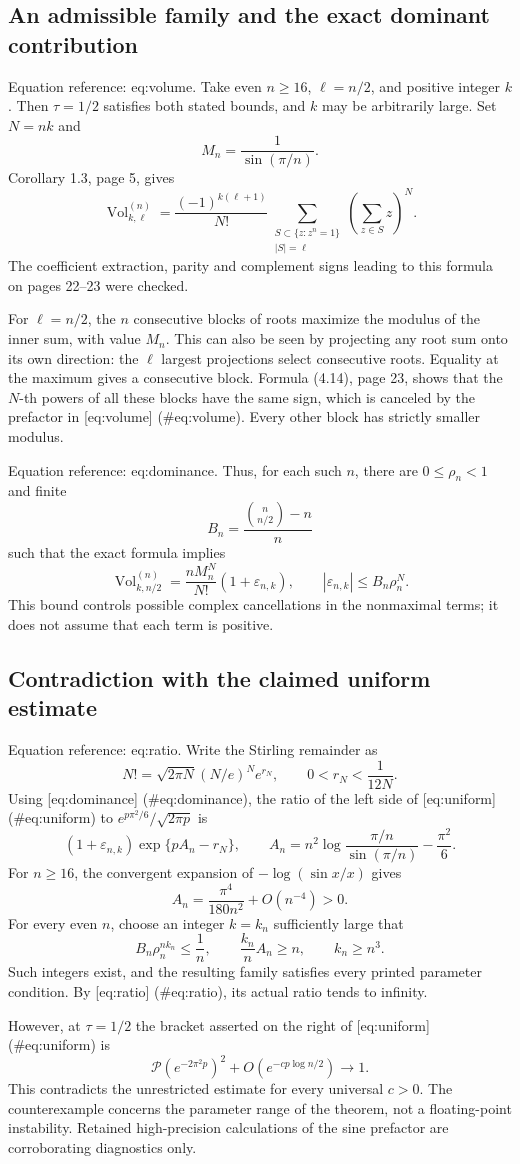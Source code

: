\documentclass[10pt]{article}
\begin{document}
\subsection*{An admissible family and the exact dominant contribution}
Equation reference: eq:volume. Take even \(n\geq16\), \(\ell=n/2\), and positive integer \(k\). Then \(\tau=1/2\) satisfies both stated bounds, and \(k\) may be arbitrarily large. Set \(N=nk\) and \[M_n=\frac1{\sin(\pi/n)}.\] Corollary 1.3, page 5, gives \[
 \operatorname{Vol}^{(n)}_{k,\ell}
 =\frac{(-1)^{k(\ell+1)}}{N!}
 \sum_{\substack{S\subset\{z:z^n=1\}\\|S|=\ell}}
       \left(\sum_{z\in S}z\right)^N .\] The coefficient extraction, parity and complement signs leading to this formula on pages 22–23 were checked.\par
For \(\ell=n/2\), the \(n\) consecutive blocks of roots maximize the modulus of the inner sum, with value \(M_n\). This can also be seen by projecting any root sum onto its own direction: the \(\ell\) largest projections select consecutive roots. Equality at the maximum gives a consecutive block. Formula (4.14), page 23, shows that the \(N\)-th powers of all these blocks have the same sign, which is canceled by the prefactor in [eq:volume] (\#eq:volume). Every other block has strictly smaller modulus.\par
Equation reference: eq:dominance. Thus, for each such \(n\), there are \(0\leq\rho_n<1\) and finite \[B_n=\frac{\binom n{n/2}-n}{n}\] such that the exact formula implies \[
 \operatorname{Vol}^{(n)}_{k,n/2}
 =\frac{nM_n^N}{N!}(1+\varepsilon_{n,k}),
 \qquad
 |\varepsilon_{n,k}|\leq B_n\rho_n^N.\] This bound controls possible complex cancellations in the nonmaximal terms; it does not assume that each term is positive.\par
\subsection*{Contradiction with the claimed uniform estimate}
Equation reference: eq:ratio. Write the Stirling remainder as \[N!=\sqrt{2\pi N}(N/e)^N e^{r_N},
 \qquad 0<r_N<\frac1{12N}.\] Using [eq:dominance] (\#eq:dominance), the ratio of the left side of [eq:uniform] (\#eq:uniform) to \(e^{p\pi^2/6}/\sqrt{2\pi p}\) is \[
 (1+\varepsilon_{n,k})\exp\{pA_n-r_N\},
 \qquad
 A_n=n^2\log\frac{\pi/n}{\sin(\pi/n)}-\frac{\pi^2}{6}.\] For \(n\geq16\), the convergent expansion of \(-\log(\sin x/x)\) gives \[A_n=\frac{\pi^4}{180n^2}+O(n^{-4})>0.\] For every even \(n\), choose an integer \(k=k_n\) sufficiently large that \[B_n\rho_n^{nk_n}\leq\frac1n,\qquad
 \frac{k_n}{n}A_n\geq n,\qquad k_n\geq n^3.\] Such integers exist, and the resulting family satisfies every printed parameter condition. By [eq:ratio] (\#eq:ratio), its actual ratio tends to infinity.\par
However, at \(\tau=1/2\) the bracket asserted on the right of [eq:uniform] (\#eq:uniform) is \[\mathcal P(e^{-2\pi^2p})^2
 +O(e^{-cp\log n/2})\longrightarrow1.\] This contradicts the unrestricted estimate for every universal \(c>0\). The counterexample concerns the parameter range of the theorem, not a floating-point instability. Retained high-precision calculations of the sine prefactor are corroborating diagnostics only.\par
\end{document}
